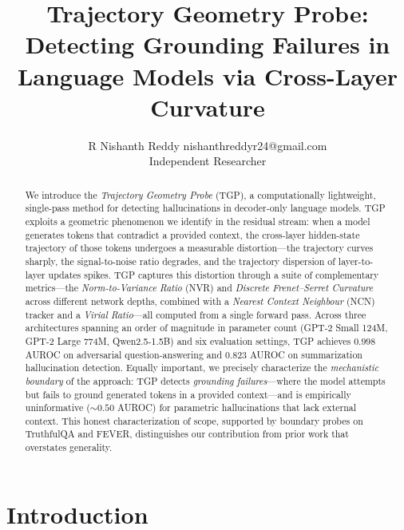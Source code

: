 \documentclass[10pt]{article}
\title{Trajectory Geometry Probe: Detecting Grounding Failures in\\Language Models via Cross-Layer Curvature}
\author{\name R Nishanth Reddy \email nishanthreddyr24@gmail.com \\
      \addr Independent Researcher}
\newcommand{\tgp}{\textsc{TGP}\xspace}
\begin{document}
\maketitle

\begin{abstract}
We introduce the \emph{Trajectory Geometry Probe} (\tgp), a computationally lightweight, single-pass method for detecting hallucinations in decoder-only language models.
\tgp exploits a geometric phenomenon we identify in the residual stream: when a model generates tokens that contradict a provided context, the cross-layer hidden-state trajectory of those tokens undergoes a measurable distortion---the trajectory curves sharply, the signal-to-noise ratio degrades, and the trajectory dispersion of layer-to-layer updates spikes.
\tgp captures this distortion through a suite of complementary metrics---the \emph{Norm-to-Variance Ratio} (NVR) and \emph{Discrete Frenet--Serret Curvature} across different network depths, combined with a \emph{Nearest Context Neighbour} (NCN) tracker and a \emph{Virial Ratio}---all computed from a single forward pass.
Across three architectures spanning an order of magnitude in parameter count (GPT-2 Small 124M, GPT-2 Large 774M, Qwen2.5-1.5B) and six evaluation settings, \tgp achieves $0.998$ AUROC on adversarial question-answering and $0.823$ AUROC on summarization hallucination detection.
Equally important, we precisely characterize the \emph{mechanistic boundary} of the approach: \tgp detects \emph{grounding failures}---where the model attempts but fails to ground generated tokens in a provided context---and is empirically uninformative (${\sim}0.50$ AUROC) for parametric hallucinations that lack external context.
This honest characterization of scope, supported by boundary probes on TruthfulQA and FEVER, distinguishes our contribution from prior work that overstates generality.
\end{abstract}

\section{Introduction}
\label{sec:intro}
\end{document}
